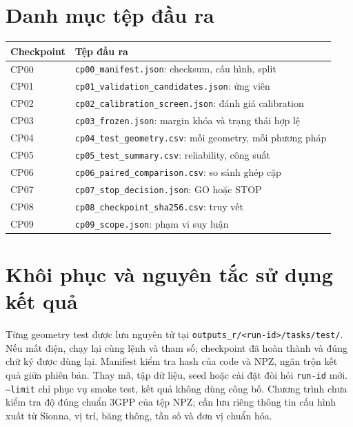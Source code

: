 \documentclass[conference,onecolumn,10pt]{IEEEtran}
\begin{document}
\section{Danh mục tệp đầu ra}
\begin{center}\begin{tabular}{ll}\toprule
Checkpoint & Tệp đầu ra\\\midrule
CP00 & \texttt{cp00\_manifest.json}: checksum, cấu hình, split\\
CP01 & \texttt{cp01\_validation\_candidates.json}: ứng viên\\
CP02 & \texttt{cp02\_calibration\_screen.json}: đánh giá calibration\\
CP03 & \texttt{cp03\_frozen.json}: margin khóa và trạng thái hợp lệ\\
CP04 & \texttt{cp04\_test\_geometry.csv}: mỗi geometry, mỗi phương pháp\\
CP05 & \texttt{cp05\_test\_summary.csv}: reliability, công suất\\
CP06 & \texttt{cp06\_paired\_comparison.csv}: so sánh ghép cặp\\
CP07 & \texttt{cp07\_stop\_decision.json}: GO hoặc STOP\\
CP08 & \texttt{cp08\_checkpoint\_sha256.csv}: truy vết\\
CP09 & \texttt{cp09\_scope.json}: phạm vi suy luận\\\bottomrule
\end{tabular}\end{center}

\section{Khôi phục và nguyên tắc sử dụng kết quả}
Từng geometry test được lưu nguyên tử tại \texttt{outputs\_r/<run-id>/tasks/test/}. Nếu mất điện, chạy lại cùng lệnh và tham số; checkpoint đã hoàn thành và đúng chữ ký được dùng lại. Manifest kiểm tra hash của code và NPZ, ngăn trộn kết quả giữa phiên bản. Thay mã, tập dữ liệu, seed hoặc cài đặt đòi hỏi \texttt{run-id} mới. \texttt{--limit} chỉ phục vụ smoke test, kết quả không dùng công bố. Chương trình chưa kiểm tra độ đúng chuẩn 3GPP của tệp NPZ; cần lưu riêng thông tin cấu hình xuất từ Sionna, vị trí, băng thông, tần số và đơn vị chuẩn hóa.
\end{document}
